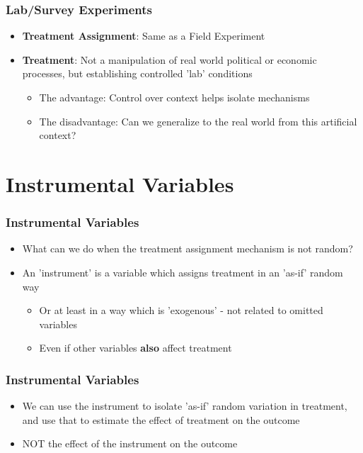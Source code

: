 \documentclass[xcolor=x11names,compress]{beamer}\usepackage[]{graphicx}\usepackage[]{color}
\renewcommand{\(}{\begin{columns}}
\renewcommand{\)}{\end{columns}}
\newcommand{\<}[1]{\begin{column}{#1}}
\renewcommand{\>}{\end{column}}
\begin{document}
\begin{frame}
\frametitle{Lab/Survey Experiments}
\begin{itemize}
\item \textbf{Treatment Assignment}: Same as a Field Experiment
\pause
\item \textbf{Treatment}: Not a manipulation of real world political or economic processes, but establishing controlled 'lab' conditions
\pause
\begin{itemize}
\item The advantage: Control over context helps isolate mechanisms
\item The disadvantage: Can we generalize to the real world from this artificial context?
\end{itemize}
\end{itemize}
\end{frame}

\section{Instrumental Variables}

\begin{frame}
\frametitle{Instrumental Variables}
\begin{itemize}
\item What can we do when the treatment assignment mechanism is not random?
\pause
\item An 'instrument' is a variable which assigns treatment in an 'as-if' random way
\pause
\begin{itemize}
\item Or at least in a way which is 'exogenous' - not related to omitted variables
\item Even if other variables \textbf{also} affect treatment
\end{itemize}
\end{itemize}
\end{frame}

\begin{frame}
\frametitle{Instrumental Variables}
\begin{itemize}
\item We can use the instrument to isolate 'as-if' random variation in treatment, and use that to estimate the effect of treatment on the outcome
\pause
\item NOT the effect of the instrument on the outcome
\end{itemize}
\end{frame}
\end{document}
